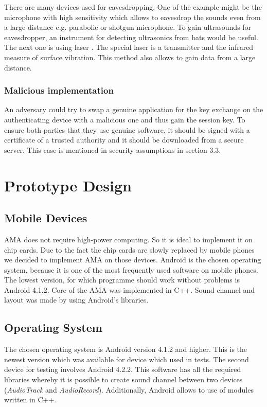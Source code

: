 \documentclass[11pt,titlepage]{article}
\theoremstyle{plain}
\begin{document}
There are many devices used for eavesdropping. One of the example might be the microphone with high sensitivity which allows to eavesdrop the sounds even from a large distance e.g. parabolic or shotgun  microphone. To gain ultrasounds for eavesdropper, an instrument for detecting ultrasonics from bats would be useful. The next one is using laser \cite{laser_mic}. The special laser is a transmitter and the infrared measure of surface vibration. This method also allows to gain data from a large distance. 

\subsubsection{Malicious implementation}
An adversary could try to swap a genuine application for the key exchange on the authenticating device with a malicious one and thus gain the session key. To ensure both parties that they use genuine software, it should be signed with a certificate of a trusted authority and it should be downloaded from a secure server. This case is mentioned in security assumptions in section 3.3.



\section{Prototype Design}
\subsection{Mobile Devices}

AMA does not require high-power computing. So it is ideal to implement it on chip cards. Due to the fact the chip cards are slowly replaced by mobile phones we decided to implement AMA on those devices. Android is the chosen operating system, because it is one of the most frequently used software on mobile phones. The lowest version, for which programme should work without problems is Android 4.1.2. Core of the AMA was implemented in C++. Sound channel and layout was made by using Android's libraries. 

\subsection{Operating System}

The chosen operating system is Android version 4.1.2 and higher. This is the newest version which was available for device which used in tests. The second device for testing involves Android 4.2.2. This software has all the required libraries whereby it is possible to create sound channel between two devices (\textit{AudioTrack} and \textit{AudioRecord}). Additionally, Android allows to use of modules written in C++. 
\end{document}

